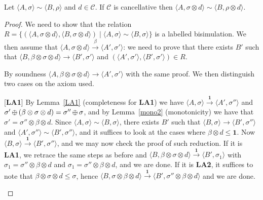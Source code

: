 \documentclass{llncs}
\def\monid{{\mathbf 0}}
\def\odiv{\, {\ominus\hspace{-7.7pt} \div} \,}
\def\monid{\mathbf{1}}
\begin{document}
\begin{proposition}
Let $\langle A,\sigma \rangle \sim \langle B,\rho \rangle$ and $d \in \mathcal{C}$.
If  $\mathcal{C}$ is cancellative then $\langle A,\sigma \otimes d\rangle \sim \langle B,\rho \otimes d \rangle$.
\end{proposition}
\begin{proof}
We need to show that the relation 
$R = \{ (\langle A,\sigma \otimes d \rangle, \langle B,\sigma \otimes d \rangle) \mid \langle A,\sigma \rangle \sim \langle B,\sigma \rangle\}$
is a labelled bisimulation. We then assume that 
$\langle A, \sigma \otimes d \rangle  \xrightarrow{\beta} \langle A', \sigma' \rangle$: 
we need to prove that there exists $B'$ such that
$\langle B,\beta \otimes  \sigma \otimes d \rangle  \xrightarrow{} \langle B', \sigma' \rangle$ 
  and $(\langle A', \sigma' \rangle, \langle B', \sigma' \rangle) \in R$.

%
By soundness 
$\langle A, \beta \otimes  \sigma \otimes d \rangle  \xrightarrow{}\langle A', \sigma' \rangle$
with the same proof.
We then distinguish two cases on the 
axiom used.

\begin{description}
\item{[{\bf LA1}]}
  By Lemma~\ref{LA1} (completeness for {\bf LA1}) we have $\langle A,  \sigma \rangle  \xrightarrow{\monid}\langle A', \sigma'' \rangle$
  and $\sigma' \odiv (\beta \otimes \sigma \otimes d) = \sigma'' \odiv \sigma$, and by Lemma~\ref{mono2} (monotonicity)
  we have that $\sigma' = \sigma'' \otimes \beta \otimes d$.
  Since $\langle A,\sigma \rangle \sim \langle B,\sigma \rangle$, 
  there exists $B'$ such that 
  $\langle B, \sigma \rangle \xrightarrow{} \langle B', \sigma'' \rangle$
  and $\langle A', \sigma'' \rangle \sim \langle B', \sigma'' \rangle$,
  and it suffices to look at the cases where $\beta \otimes d \leq \monid$.
%
Now $\langle B, \sigma \rangle \xrightarrow{\monid} \langle B', \sigma'' \rangle$, and we may now check the proof of
such reduction.
If it is  {\bf LA1}, we retrace the same steps as before and 
$\langle B, \beta \otimes  \sigma \otimes d \rangle  \xrightarrow{\monid} \langle B', \sigma_1 \rangle$
with $\sigma_1 = \sigma'' \otimes \beta \otimes d$
and $\sigma_1 = \sigma'' \otimes \beta \otimes d$, and we are done.
%
If it is  {\bf LA2}, it suffices to note that $\beta \otimes \sigma \otimes d\leq \sigma$,
hence $\langle B, \sigma \otimes \beta \otimes d \rangle \xrightarrow{\monid} \langle B', \sigma'' \otimes \beta \otimes d\rangle$
and we are done.


\end{description}
\end{proof}
\end{document}
